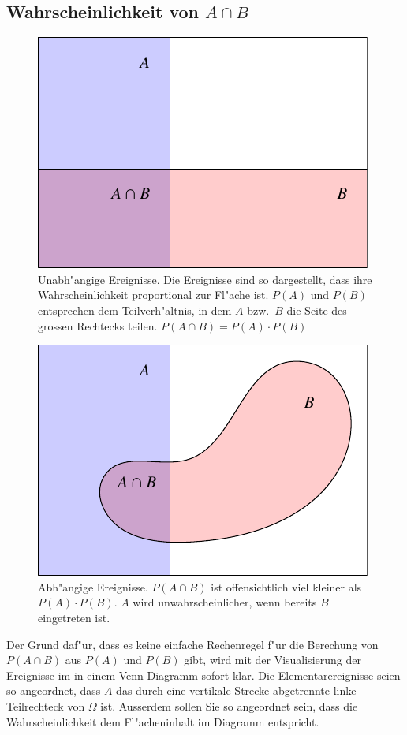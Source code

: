 \subsection{Wahrscheinlichkeit von \texorpdfstring{$A\cap B$}{A geschnitten B}}
\begin{figure}
\begin{center}
\includegraphics{images/abhaengigkeit-1}
\end{center}
\caption{Unabh"angige Ereignisse. Die Ereignisse sind so dargestellt,
dass ihre Wahrscheinlichkeit proportional zur Fl"ache ist. $P(A)$ und $P(B)$
entsprechen dem Teilverh"altnis, in dem $A$ bzw.~$B$ die Seite des grossen
Rechtecks teilen. $P(A\cap B)=P(A)\cdot P(B)$\label{unabhaengig}}
\end{figure}
\begin{figure}
\begin{center}
\includegraphics{images/abhaengigkeit-2}
\end{center}
\caption{Abh"angige Ereignisse. $P(A\cap B)$ ist offensichtlich viel kleiner
als $P(A)\cdot P(B)$. $A$ wird unwahrscheinlicher, wenn bereits $B$ eingetreten
ist.
\label{abhaengig}}
\end{figure}
Der Grund daf"ur, dass es keine einfache Rechenregel f"ur die Berechung von 
$P(A\cap B)$ aus $P(A)$ und $P(B)$ gibt, wird mit der
Visualisierung der Ereignisse im in einem Venn-Diagramm sofort klar.
Die Elementarereignisse seien so angeordnet, dass $A$ das durch eine
vertikale Strecke abgetrennte linke Teilrechteck von $\Omega$ ist. Ausserdem
sollen Sie so angeordnet sein, dass die Wahrscheinlichkeit dem
Fl"acheninhalt im Diagramm entspricht.

